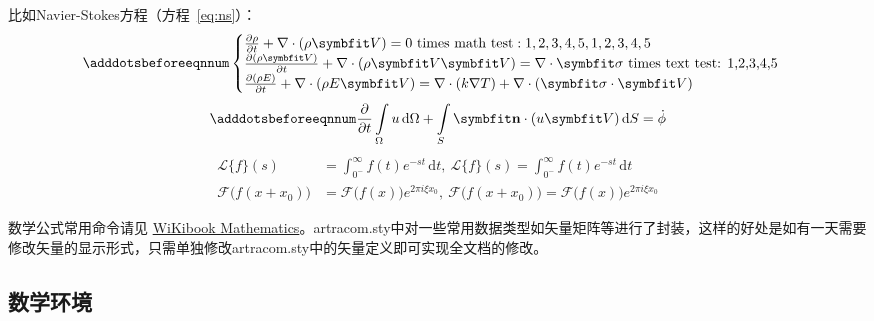 比如Navier-Stokes方程（方程~\eqref{eq:ns}）：
\begin{equation} \label{eq:ns}
    \adddotsbeforeeqnnum%
    \begin{cases}
        \frac{\partial \rho}{\partial t} + \nabla\cdot(\rho\Vector{V}) = 0 \ \mathrm{times\ math\ test: 1,2,3,4,5}, 1,2,3,4,5\\
        \frac{\partial (\rho\Vector{V})}{\partial t} + \nabla\cdot(\rho\Vector{V}\Vector{V}) = \nabla\cdot\Tensor{\sigma} \ \text{times text test: 1,2,3,4,5}\\
        \frac{\partial (\rho E)}{\partial t} + \nabla\cdot(\rho E\Vector{V}) = \nabla\cdot(k\nabla T) + \nabla\cdot(\Tensor{\sigma}\cdot\Vector{V})
    \end{cases}
\end{equation}
\begin{equation}
    \adddotsbeforeeqnnum%
    \frac{\partial }{\partial t}\int\limits_{\Omega} u \, \mathrm{d}\Omega + \int\limits_{S} \unitVector{n}\cdot(u\Vector{V}) \, \mathrm{d}S = \dot{\phi}
\end{equation}
\[
    \begin{split}
        \mathcal{L} \{f\}(s) &= \int _{0^{-}}^{\infty} f(t) e^{-st} \, \mathrm{d}t, \ 
        \mathscr{L} \{f\}(s) = \int _{0^{-}}^{\infty} f(t) e^{-st} \, \mathrm{d}t\\
        \mathcal{F} {\bigl (} f(x+x_{0}) {\bigr )} &= \mathcal{F} {\bigl (} f(x) {\bigr )} e^{2\pi i\xi x_{0}}, \ 
        \mathscr{F} {\bigl (} f(x+x_{0}) {\bigr )} = \mathscr{F} {\bigl (} f(x) {\bigr )} e^{2\pi i\xi x_{0}}
    \end{split}
\]

数学公式常用命令请见 \href{https://en.wikibooks.org/wiki/LaTeX/Mathematics}{WiKibook Mathematics}。artracom.sty中对一些常用数据类型如矢量矩阵等进行了封装，这样的好处是如有一天需要修改矢量的显示形式，只需单独修改artracom.sty中的矢量定义即可实现全文档的修改。

\subsection{数学环境}

